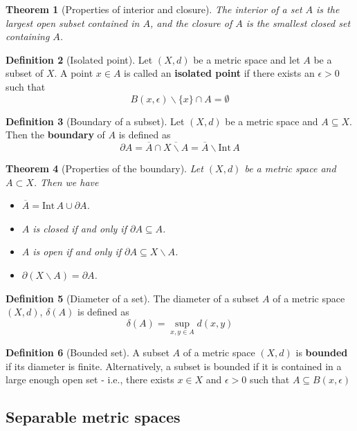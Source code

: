 \documentclass[10pt, oneside, reqno]{amsart}
\theoremstyle{plain}%
\newtheorem{thm}{Theorem}[section]
\theoremstyle{definition}
\newtheorem{defn}[thm]{Definition}
\theoremstyle{remark}
\newcommand{\met}{(X,d)}
\newcommand{\intr}{\text{Int}\,}
\newcommand{\ol}[1]{\overline{#1}}
\begin{document}
\begin{thm}[Properties of interior and closure]
    The interior of a set $A$ is the largest open subset contained in $A$, and the closure of $A$ is the smallest closed set containing $A$.
\end{thm}


\begin{defn}[Isolated point]
    Let $\met$ be a metric space and let $A$ be a subset of $X$.  A point $x \in A$ is called an \textbf{isolated point} if there exists an $\epsilon > 0$ such that \[
        B(x, \epsilon) \backslash \{ x \} \cap A = \emptyset
    \]
\end{defn}

\begin{defn}[Boundary of a subset]
Let $\met$ be a metric space and $A \subseteq X$.  Then the \textbf{boundary} of $A$ is defined as \[
    \partial A = \ol{A} \cap \ol{X \backslash A} = \ol{A} \backslash \intr A
\]
\end{defn}
\begin{thm}[Properties of the boundary]
    Let $\met$ be a metric space and $A \subset X$. Then we have \begin{itemize}
        \item $\ol A = \intr A \cup \partial A$.
        \item $A$ is closed if and only if $\partial A \subseteq A$.
        \item $A$ is open if and only if $\partial A \subseteq X \backslash A$.
        \item $\partial (X \backslash A) = \partial A$.
    \end{itemize}
\end{thm}


\begin{defn}[Diameter of a set]
    The diameter of a subset $A$ of a metric space $\met$, $\delta(A)$ is defined as \[
        \delta(A) = \sup_{x,y \in A} d(x,y)
    \]
\end{defn}

\begin{defn}[Bounded set]
    A subset $A$ of a metric space $\met$ is \textbf{bounded} if its diameter is finite.  Alternatively, a subset is bounded if it is contained in a large enough open set - i.e., there exists $x \in X$ and $\epsilon > 0$ such that $ A \subseteq B(x, \epsilon)$ 
\end{defn}

\subsection{Separable metric spaces} %
\label{sub:separable_metric_spaces}
\end{document}

